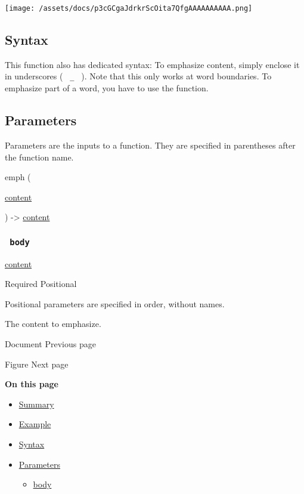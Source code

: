 \texttt{[image: /assets/docs/p3cGCgaJdrkrScOita7QfgAAAAAAAAAA.png]}

\subsection{Syntax}\label{syntax}

This function also has dedicated syntax: To emphasize content, simply
enclose it in underscores ( \texttt{\ \_\ } ). Note that this only works
at word boundaries. To emphasize part of a word, you have to use the
function.

\subsection{\texorpdfstring{{ Parameters
}}{ Parameters }}\label{parameters}

\label{parameters-tooltip}
Parameters are the inputs to a function. They are specified in
parentheses after the function name.

{ emph } (

{ \href{/docs/reference/foundations/content/}{content} }

) -\textgreater{} \href{/docs/reference/foundations/content/}{content}

\subsubsection{\texorpdfstring{\texttt{\ body\ }}{ body }}\label{parameters-body}

\href{/docs/reference/foundations/content/}{content}

{Required} {{ Positional }}

\label{parameters-body-positional-tooltip}
Positional parameters are specified in order, without names.

The content to emphasize.

\href{/docs/reference/model/document/}{\pandocbounded{}}

{ Document } { Previous page }

\href{/docs/reference/model/figure/}{\pandocbounded{}}

{ Figure } { Next page }

\textbf{On this page}

\begin{itemize}
\tightlist
\item
  \hyperref[summary]{Summary}
\item
  \hyperref[example]{Example}
\item
  \hyperref[syntax]{Syntax}
\item
  \hyperref[parameters]{Parameters}

  \begin{itemize}
  \tightlist
  \item
    \hyperref[parameters-body]{body}
  \end{itemize}
\end{itemize}

